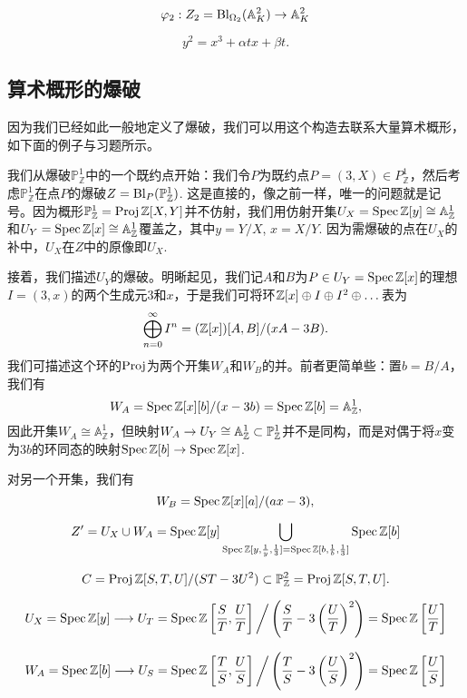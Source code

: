 \[
	\varphi_2:Z_2=\operatorname{Bl}_{\Omega_2}(\mathbb A_K^2)\to \mathbb A_K^2
\]

\[
	y^2=x^3+\alpha tx+\beta t.
\]

\subsection{算术概形的爆破}\label{s:4.2.4}

因为我们已经如此一般地定义了爆破，我们可以用这个构造去联系大量算术概形，如下面的例子与习题所示。

我们从爆破$\mathbb P_{\mathbb Z}^1$中的一个既约点开始：我们令$P$为既约点$P=(3,X)\in P_{\mathbb Z}^1$，然后考虑$\mathbb P_{\mathbb Z}^1$在点$P$的爆破$Z=\operatorname{Bl}_P(\mathbb P_{\mathbb Z}^1)$. 这是直接的，像之前一样，唯一的问题就是记号。因为概形$\mathbb P_{\mathbb Z}^1=\operatorname{Proj} \mathbb{Z}[X,Y]$并不仿射，我们用仿射开集$U_X=\operatorname{Spec} \mathbb{Z}[y]\cong \mathbb A_{\mathbb Z}^1$和$U_Y=\operatorname{Spec} \mathbb{Z}[x]\cong \mathbb A_{\mathbb Z}^1$覆盖之，其中$y=Y/X$, $x=X/Y$. 因为需爆破的点在$U_X$的补中，$U_X$在$Z$中的原像即$U_X$.

接着，我们描述$U_Y$的爆破。明晰起见，我们记$A$和$B$为$P\in U_Y=\operatorname{Spec} \mathbb{Z}[x]$的理想$I=(3,x)$的两个生成元$3$和$x$，于是我们可将环$\mathbb{Z}[x]\oplus I\oplus I^2\oplus \dots$表为
\[
	\bigoplus_{n=0}^\infty I^n=(\mathbb{Z}[x])[A,B]/(xA-3B).
\]%
我们可描述这个环的$\operatorname{Proj}$为两个开集$W_A$和$W_B$的并。前者更简单些：置$b=B/A$，我们有
\[
	W_A=\operatorname{Spec} \mathbb{Z}[x][b]/(x-3b)=\operatorname{Spec} \mathbb{Z}[b]=\mathbb A_{\mathbb{Z}}^1,
\]
因此开集$W_A\cong \mathbb A_{\mathbb Z}^1$，但映射$W_A\to U_Y\cong \mathbb A_{\mathbb{Z}}^1\subset \mathbb P_{\mathbb{Z}}^1$并不是同构，而是对偶于将$x$变为$3b$的环同态的映射$\operatorname{Spec} \mathbb{Z}[b]\to \operatorname{Spec} \mathbb{Z}[x]$.

对另一个开集，我们有
\[
	W_B=\operatorname{Spec} \mathbb{Z}[x][a]/(ax-3),
\]

\nottran

\[
	Z'=U_X\cup W_A=\operatorname{Spec} \mathbb{Z}[y]\bigcup_{\operatorname{Spec} \mathbb{Z}[y,\frac 1y,\frac 13]=\operatorname{Spec} \mathbb{Z}[b,\frac 1b,\frac 13]}\operatorname{Spec} \mathbb{Z}[b]
\]

\[
	C=\operatorname{Proj} \mathbb{Z}[S,T,U]/(ST-3U^2)\subset \mathbb P_{\mathbb{Z}}^2=\operatorname{Proj} \mathbb{Z}[S,T,U].
\]


\[
	U_X=\operatorname{Spec} \mathbb{Z}[y]\longrightarrow U_T=\operatorname{Spec} \mathbb{Z} \left[\frac ST,\frac UT\right]\bigg / \left(\frac ST-3\left(\frac UT\right)^2\right)=\operatorname{Spec} \mathbb{Z} \left[\frac UT\right]
\]

\[
	W_A=\operatorname{Spec} \mathbb{Z}[b]\longrightarrow U_S=\operatorname{Spec} \mathbb{Z} \left[\frac TS,\frac US\right]\bigg / \left(\frac TS-3\left(\frac US\right)^2\right)=\operatorname{Spec} \mathbb{Z} \left[\frac US\right]
\]

